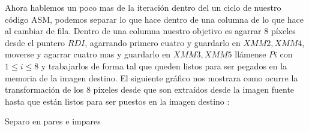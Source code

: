 Ahora hablemos un poco mas de la iteración dentro del un ciclo de nuestro código ASM, podemos separar lo que hace dentro de una columna de lo que hace al cambiar de fila. Dentro de una columna nuestro objetivo es agarrar 8 píxeles desde el puntero $RDI$, agarrando primero cuatro y guardarlo en $XMM2, XMM4$, moverse y agarrar cuatro mas y guardarlo en $XMM3, XMM5$ llámense $Pi$ con $1\leq i\leq 8$ y trabajarlos de forma tal que queden listos para ser pegados en la memoria de la imagen destino. El siguiente gráfico nos mostrara como ocurre la transformación de los 8 píxeles desde que son extraídos desde la imagen fuente hasta que están listos para ser puestos en la imagen destino : 

\begin{center}
\end{center}

Separo en pares e impares

